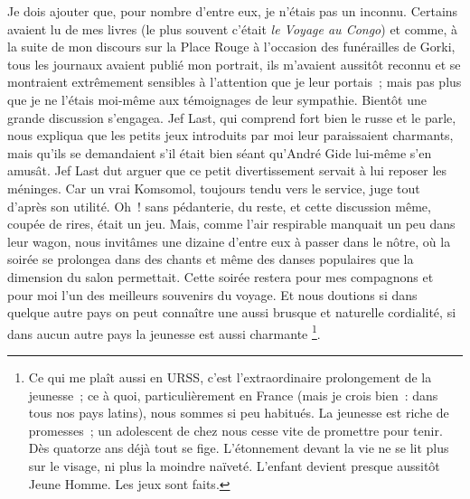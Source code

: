 \documentclass[twoside]{book} %
\begin{document}
Je dois ajouter que, pour nombre d’entre eux, je n’étais pas un inconnu. Certains avaient lu de mes livres (le plus souvent c’était \emph{le Voyage au Congo}) et comme, à la suite de mon discours sur la Place Rouge à l’occasion des funérailles de Gorki, tous les journaux avaient publié mon portrait, ils m’avaient aussitôt reconnu et se montraient extrêmement sensibles à l’attention que je leur portais ; mais pas plus que je ne l’étais moi-même aux témoignages de leur sympathie. Bientôt une grande discussion s’engagea. Jef Last, qui comprend fort bien le russe et le parle, nous expliqua que les petits jeux introduits par moi leur paraissaient charmants, mais qu’ils se demandaient s’il était bien séant qu’André Gide lui-même s’en amusât. Jef Last dut arguer que ce petit divertissement servait à lui reposer les méninges. Car un vrai Komsomol, toujours tendu vers le service, juge tout d’après son utilité. Oh ! sans pédanterie, du reste, et cette discussion même, coupée de rires, était un jeu. Mais, comme l’air respirable manquait un peu dans leur wagon, nous invitâmes une dizaine d’entre eux à passer dans le nôtre, où la soirée se prolongea dans des chants et même des danses populaires que la dimension du salon permettait. Cette soirée restera pour mes compagnons et pour moi l’un des meilleurs souvenirs du voyage. Et nous doutions si dans quelque autre pays on peut connaître une aussi brusque et naturelle cordialité, si dans aucun autre pays la jeunesse est aussi charmante \footnote{Ce qui me plaît aussi en URSS, c’est l’extraordinaire prolongement de la jeunesse ; ce à quoi, particulièrement en France (mais je crois bien : dans tous nos pays latins), nous sommes si peu habitués. La jeunesse est riche de promesses ; un adolescent de chez nous cesse vite de promettre pour tenir. Dès quatorze ans déjà tout se fige. L’étonnement devant la vie ne se lit plus sur le visage, ni plus la moindre naïveté. L’enfant devient presque aussitôt Jeune Homme. Les jeux sont faits.}.\par
\end{document}
